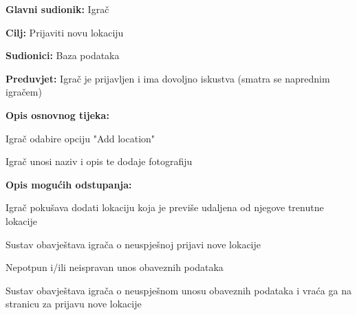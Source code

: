 					\noindent {}
					\begin{packed_item}
	
						\item \textbf{Glavni sudionik: }Igrač
						\item  \textbf{Cilj:} Prijaviti novu lokaciju
						\item  \textbf{Sudionici:} Baza podataka
						\item  \textbf{Preduvjet:} Igrač je prijavljen i ima dovoljno iskustva (smatra se naprednim igračem)
						\item  \textbf{Opis osnovnog tijeka:}
						
						\item[] \begin{packed_enum}
	
							\item Igrač odabire opciju "Add location"
							\item Igrač unosi naziv i opis te dodaje fotografiju

						\end{packed_enum}
						
						\item  \textbf{Opis mogućih odstupanja:}
						
						\item[] \begin{packed_item}
	
							\item[1.a] Igrač pokušava dodati lokaciju koja je previše udaljena od njegove trenutne lokacije
							\item[] \begin{packed_enum}
								
								\item Sustav obavještava igrača o neuspješnoj prijavi nove lokacije
								
							\end{packed_enum}
							
							\item[2.a] Nepotpun i/ili neispravan unos obaveznih podataka
							\item[] \begin{packed_enum}
								
								\item Sustav obavještava igrača o neuspješnom unosu obaveznih podataka i vraća ga na stranicu za prijavu nove lokacije
								
							\end{packed_enum}
							
						\end{packed_item}
					\end{packed_item}
					
